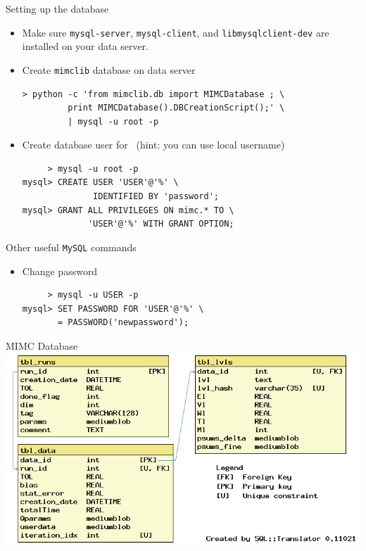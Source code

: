 \begin{frame}[fragile]{Setting up the database}
  \begin{itemize}
  \item Make sure \texttt{mysql-server}, \texttt{mysql-client}, and
    \texttt{libmysqlclient-dev} are installed on your data server.
  \item Create \texttt{mimclib} database on data server
\begin{verbatim}
> python -c 'from mimclib.db import MIMCDatabase ; \
         print MIMCDatabase().DBCreationScript();' \
         | mysql -u root -p
\end{verbatim}
\item Create database user for \lib~(hint: you can use local username)
\begin{verbatim}
     > mysql -u root -p
mysql> CREATE USER 'USER'@'%' \
              IDENTIFIED BY 'password';
mysql> GRANT ALL PRIVILEGES ON mimc.* TO \
             'USER'@'%' WITH GRANT OPTION;
\end{verbatim}
  \end{itemize}
\end{frame}

\begin{frame}[fragile]{Other useful \texttt{MySQL} commands}
  \begin{itemize}
  \item Change password
\begin{verbatim}
     > mysql -u USER -p
mysql> SET PASSWORD FOR 'USER'@'%' \
       = PASSWORD('newpassword');
\end{verbatim}
  \end{itemize}
\end{frame}

\begin{frame}{MIMC Database}
\centering
\includegraphics[scale=0.6]{src/imgs/db_schema}
\end{frame}

